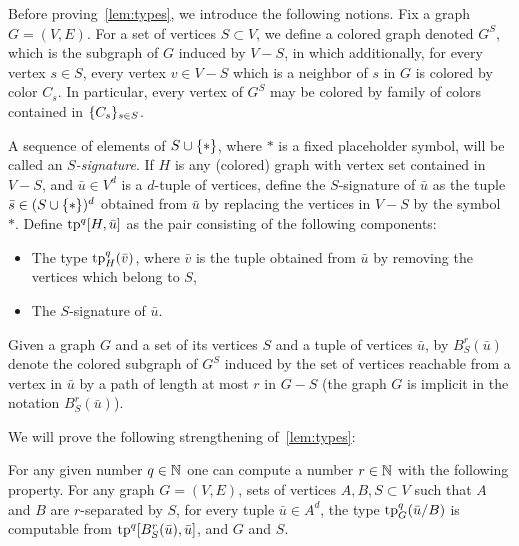 Before proving~\cref{lem:types}, we introduce the following notions.
Fix a graph $G=(V,E)$.
For a set of vertices $S\subset V$,
we define a colored graph denoted $G^S$, which is 
the subgraph of $G$ induced by $V-S$,
in which additionally, for every vertex $s\in S$, every vertex $v\in V-S$ which is a neighbor of  $s$ in $G$ is colored by color $C_s$. In particular, every vertex of $G^S$
may be colored by family of colors contained in $\{C_s\}_{s\in S}$.

A sequence of elements of $S\cup\{\ast\}$,
where $\ast$ is a fixed placeholder symbol,
will be called an \emph{$S$-signature}.
If $H$ is any (colored) graph with vertex set contained in $V-S$,
and $\bar u\in V^d$ is a $d$-tuple of vertices,
define the {$S$-signature} of $\bar u$
as the tuple $\bar s\in (S\cup\{\ast\})^d$ obtained from $\bar u$ by replacing the vertices in $V-S$ by the symbol~$\ast$.
 Define $\mathrm{tp}^q[H,\bar u]$ as the
pair consisting of the following components:
\begin{itemize}
	\item The type $\mathrm{tp}^q_H(\bar v)$,
	where $\bar v$ is the tuple obtained from $\bar u$
	by removing the vertices which belong to $S$,
	\item The $S$-signature of $\bar u$.
\end{itemize}

Given a graph $G$ and a set of its vertices $S$ and a tuple of vertices $\bar u$,
by $B^r_S(\bar u)$ denote the 
	colored subgraph of $G^S$ induced by the set of vertices reachable from a vertex in $\bar u$
	by a path of length at most $r$
  in $G-S$
  (the graph $G$ is implicit in the notation $B^r_S(\bar u)$).

We will prove the following strengthening of~\cref{lem:types}:

\begin{lemma}%
  \label{lem:types1}
For any given number $q\in\mathbb{N}$ one can compute 
 a number $r\in\mathbb{N}$ with the following property.
	For any graph $G=(V,E)$, sets of vertices $A,B,S\subset V$	
	such that $A$  and $B$ are $r$-separated by $S$,
	for every tuple $\bar u\in A^{d}$, 
	the type $\mathrm{tp}^q_G(\bar u/B)$
	is computable from $\mathrm{tp}^{q}[B^r_S(\bar u), \bar u]$, and $G$ and $S$.
	
	
	
\end{lemma}


